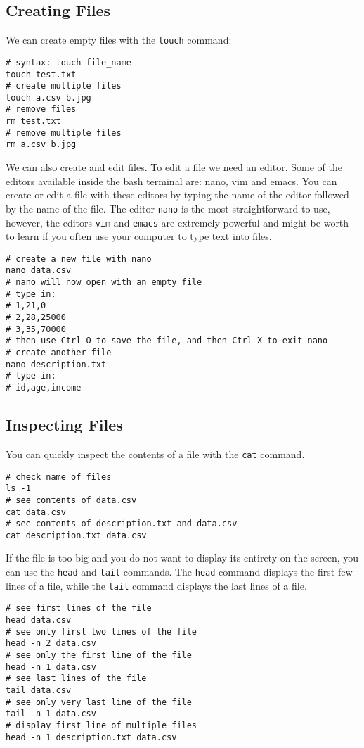 \documentclass[12pt, a4paper]{article}
\begin{document}
\subsection{Creating Files}
\label{sec:orgff639cc}
We can create empty files with the \texttt{touch} command:
\lstset{language=bash,label= ,caption= ,captionpos=b,firstnumber=1,numbers=left,style=bash}
\begin{lstlisting}
# syntax: touch file_name
touch test.txt
# create multiple files
touch a.csv b.jpg
# remove files
rm test.txt
# remove multiple files
rm a.csv b.jpg
\end{lstlisting}
We can also create and edit files.
To edit a file we need an editor.
Some of the editors available inside the bash terminal are: \href{https://www.nano-editor.org}{nano}, \href{https://www.vim.org}{vim} and \href{https://www.gnu.org/software/emacs/}{emacs}.
You can create or edit a file with these editors by typing the name of the editor followed by the name of the file.
The editor \texttt{nano} is the most straightforward to use, however, the editors \texttt{vim} and \texttt{emacs} are extremely powerful and might be worth to learn if you often use your computer to type text into files.
\lstset{language=bash,label= ,caption= ,captionpos=b,firstnumber=1,numbers=left,style=bash}
\begin{lstlisting}
# create a new file with nano
nano data.csv
# nano will now open with an empty file
# type in:
# 1,21,0
# 2,28,25000
# 3,35,70000
# then use Ctrl-O to save the file, and then Ctrl-X to exit nano
# create another file
nano description.txt
# type in:
# id,age,income
\end{lstlisting}
\subsection{Inspecting Files}
\label{sec:org8b2afa8}
You can quickly inspect the contents of a file with the \texttt{cat} command.
\lstset{language=bash,label= ,caption= ,captionpos=b,firstnumber=1,numbers=left,style=bash}
\begin{lstlisting}
# check name of files
ls -1
# see contents of data.csv
cat data.csv
# see contents of description.txt and data.csv
cat description.txt data.csv
\end{lstlisting}
If the file is too big and you do not want to display its entirety on the screen, you can use the \texttt{head} and \texttt{tail} commands.
The \texttt{head} command displays the first few lines of a file, while the \texttt{tail} command displays the last lines of a file.
\lstset{language=bash,label= ,caption= ,captionpos=b,firstnumber=1,numbers=left,style=bash}
\begin{lstlisting}
# see first lines of the file
head data.csv
# see only first two lines of the file
head -n 2 data.csv
# see only the first line of the file
head -n 1 data.csv
# see last lines of the file
tail data.csv
# see only very last line of the file
tail -n 1 data.csv
# display first line of multiple files
head -n 1 description.txt data.csv
\end{lstlisting}
\end{document}
